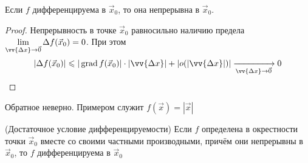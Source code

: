 \begin{theorem}
	Если $f$ дифференцируема в $\vec{x}_0$, то она непрерывна в $\vec{x}_0$.
\end{theorem}

\begin{proof}
	Непрерывность в точке $\vec{x}_0$ равносильно наличию предела $\liml_{\vv{\Delta x} \to \vec{0}} \Delta f(\vec{x}_0) = 0$. При этом
	\[
		|\Delta f(\vec{x}_0)| \le |\grad f(\vec{x}_0)| \cdot |\vv{\Delta x}| + |o(|\vv{\Delta x}|)| \xrightarrow[\vv{\Delta x} \to \vec{0}]{} 0
	\]
\end{proof}

\begin{example}
	Обратное неверно. Примером служит $f(\vec{x}) = |\vec{x}|$
\end{example}

\begin{theorem} (Достаточное условие дифференцируемости)
	Если $f$ определена в окрестности точки $\vec{x}_0$ вместе со своими частными производными, причём они непрерывны в $\vec{x}_0$, то $f$ дифференцируема в $\vec{x}_0$
\end{theorem}

